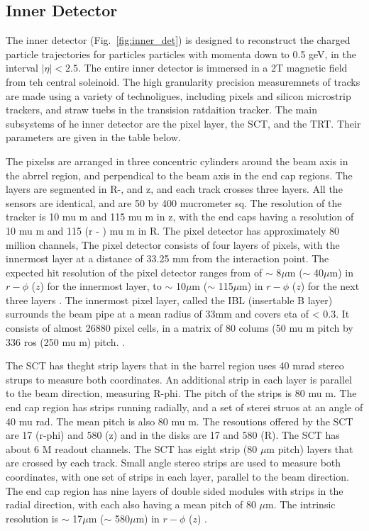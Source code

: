 \subsection{Inner Detector}
The inner detector (Fig.~\ref{fig:inner_det}) is designed to reconstruct the charged particle trajectories for particles particles with momenta down to 0.5 geV, in the interval $|\eta| < 2.5$. The entire inner detector is immersed in a 2T magnetic field from teh central soleinoid. The high granularity precision measuremnets of tracks are made using a variety of technoligues, including pixels and silicon microstrip trackers, and straw tuebs in the transision ratdaition tracker. The main subsystems of he inner detector are the pixel layer, the SCT, and the TRT. Their parameters are given in the table below. 



The pixelss are arranged in three concentric cylinders around the beam axis in the abrrel region, and perpendical to the beam axis in the end cap regions. The layers are segmented in R-\phi, and z, and each track crosses three layers. All the sensors are identical, and are 50 by 400 mucrometer sq. The resolution of the tracker is 10 mu m and 115 mu m in z, with the end caps having a resolution of 10 mu m and 115 (r - \phi) mu m in R. The pixel detector has approximately 80 million channels,  
The pixel detector consists of four layers of pixels, with the innermost layer at a distance of 33.25 mm from the interaction point. The expected hit resolution of the pixel detector ranges from of $\sim$ 8$\mu$m ($\sim$ 40$\mu$m) in $r-\phi$ ($z$) \cite{ibl_design} for the innermost layer, to $\sim$ 10$\mu$m ($\sim$ 115$\mu$m) in $r-\phi$ ($z$) for the next three layers \cite{Aad:2008zzm}.
The innermost pixel layer, called the IBL (insertable B layer) surrounds the beam pipe at a mean radius of 33mm and covers eta of < 0.3. It consists of almost 26880 pixel cells, in a matrix of 80 colums (50 mu m pitch by 336 ros (250 mu m) pitch. \cite{LaRosa:2016nbd}.

The SCT has theght strip layers that in the barrel region uses 40 mrad stereo strups to measure both coordinates. An additional strip in each layer is parallel to the beam direction, measuring R-phi. The pitch of the strips is 80 mu m. The end cap region has strips running radially, and a set of sterei struos at an angle of 40 mu rad. The mean pitch is also 80 mu m. The resoutions offered by the SCT are 17 (r-phi) and 580 (z) and in the disks are 17 and 580 (R). The SCT has about 6 M readout channels.
The SCT has eight strip (80 $\mu$m pitch) layers that are crossed by each track. Small angle stereo strips are used to measure both coordinates, with one set of strips in each layer, parallel to the beam direction. The end cap region has nine layers of double sided modules with strips in the radial direction, with each also having a mean pitch of 80 $\mu$m. The intrinsic resolution is $\sim$ 17$\mu$m ($\sim$ 580$\mu$m) in $r-\phi$ ($z$)  \cite{Aad:2008zzm}.


